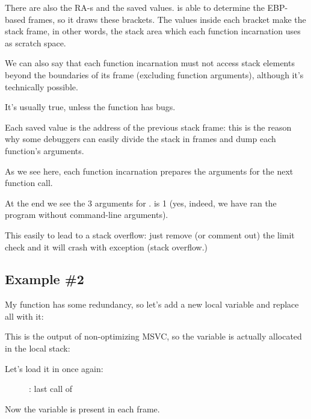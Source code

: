 There are also the \ac{RA}-s and the saved \EBP values.
\olly is able to determine the EBP-based frames, so it draws these brackets.
The values inside each bracket make the \gls{stack frame}, 
in other words, the stack area which each function incarnation uses as scratch space. 

We can also say that each function incarnation must not access
stack elements beyond the boundaries of its frame (excluding function arguments), 
although it's technically possible. 

It's usually true, unless the function has bugs.

Each saved \EBP value is the address of the previous \gls{stack frame}: 
this is the reason why some debuggers can easily divide the stack in frames and dump each 
function's arguments.

As we see here, each function incarnation prepares the arguments for the next function call.

At the end we see the 3 arguments for \main. 
 is 1 (yes, indeed, we have ran the program without command-line arguments).

This easily to lead to a stack overflow: just remove (or comment out) the limit check and it will crash with
exception  (stack overflow.)

\subsection{Example \#2}

My function has some redundancy, so let's add a new local variable  and replace all  with it:



This is the output of non-optimizing MSVC, so the  variable is actually allocated 
in the local stack:



\clearpage
Let's load it in \olly once again:

\begin{figure}[H]
\centering
{}
\caption{\olly: last call of \ttf{}}
\label{fig:fib_olly2}
\end{figure}

Now the  variable is present in each frame.

\clearpage

